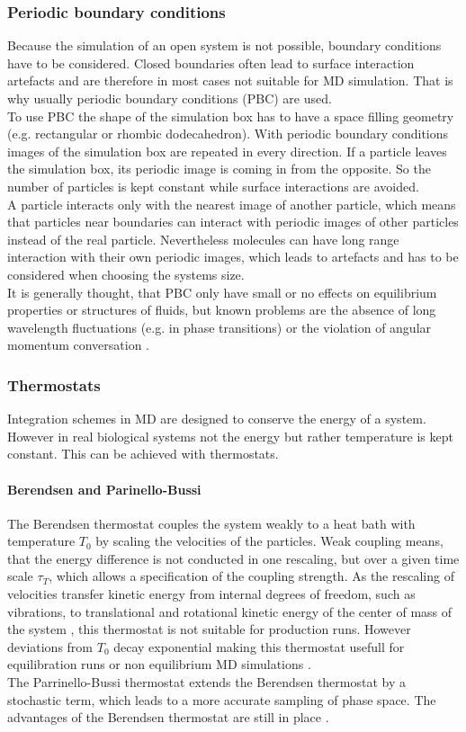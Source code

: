 \subsubsection{Periodic boundary conditions}
\label{subsec:pbc}
Because the simulation of an open system is not possible, boundary conditions have to be considered. Closed boundaries often lead to surface interaction artefacts and are therefore in most cases not suitable for MD simulation. That is why usually periodic boundary conditions (PBC) are used.\\
To use PBC the shape of the simulation box has to have a space filling geometry (e.g. rectangular or rhombic dodecahedron). With periodic boundary conditions images of the simulation box are repeated in every direction. If a particle leaves the simulation box, its periodic image is coming in from the opposite. So the number of particles is kept constant while surface interactions are avoided.\\
A particle interacts only with the nearest image of another particle, which means that particles near boundaries can interact with periodic images of other particles instead of the real particle. Nevertheless molecules can have long range interaction with their own periodic images, which leads to artefacts and has to be considered when choosing the systems size.\\
It is generally thought, that PBC only have small or no effects on equilibrium properties or structures of fluids, but known problems are the absence of long wavelength fluctuations (e.g. in phase transitions) or the violation of angular momentum conversation \autocite[p. 141f]{greenBook}.
\subsubsection{Thermostats}
Integration schemes in MD are designed to conserve the energy of a system. However in real biological systems not the energy but rather temperature is kept constant. This can be achieved with thermostats.
\paragraph{Berendsen and Parinello-Bussi}
The Berendsen thermostat \autocite{berendsen} couples the system weakly to a heat bath with temperature $T_0$ by scaling the velocities of the particles. Weak coupling means, that the energy difference is not conducted in one rescaling, but over a given time scale $\tau_T$, which allows a specification of the coupling strength. As the rescaling of velocities transfer kinetic energy from internal degrees of freedom, such as vibrations, to translational and rotational kinetic energy of the center of mass of the system \autocite[p. 738]{velRescaleSucks}, this thermostat is not suitable for production runs. However deviations from $T_0$ decay exponential making this thermostat usefull for equilibration runs or non equilibrium MD simulations \autocite[p. 3689]{berendsen}.\\
The Parrinello-Bussi  thermostat \autocite{parinelloBussi} extends the Berendsen thermostat by a stochastic term, which leads to a more accurate sampling of phase space. The advantages of the Berendsen thermostat are still in place \autocite[p. 31]{gromacsManual}.
